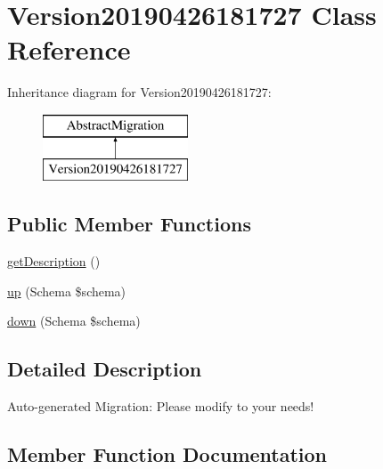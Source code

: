 \hypertarget{class_doctrine_migrations_1_1_version20190426181727}{}\section{Version20190426181727 Class Reference}
\label{class_doctrine_migrations_1_1_version20190426181727}
Inheritance diagram for Version20190426181727\+:\begin{figure}[H]
\begin{center}
\leavevmode
\includegraphics[height=2.000000cm]{class_doctrine_migrations_1_1_version20190426181727}
\end{center}
\end{figure}
\subsection*{Public Member Functions}
\begin{DoxyCompactItemize}
\item 
\mbox{\hyperlink{class_doctrine_migrations_1_1_version20190426181727_a2e7bb35c71bf1824456ceb944cb7a845}{get\+Description}} ()
\item 
\mbox{\hyperlink{class_doctrine_migrations_1_1_version20190426181727_a23eb1c1428e8ea2ab2cf798fc06ec421}{up}} (Schema \$schema)
\item 
\mbox{\hyperlink{class_doctrine_migrations_1_1_version20190426181727_aa8eb70255a46429d4d6165c778c9e5b9}{down}} (Schema \$schema)
\end{DoxyCompactItemize}


\subsection{Detailed Description}
Auto-\/generated Migration\+: Please modify to your needs! 

\subsection{Member Function Documentation}
\mbox{\label{class_doctrine_migrations_1_1_version20190426181727_aa8eb70255a46429d4d6165c778c9e5b9}} 
